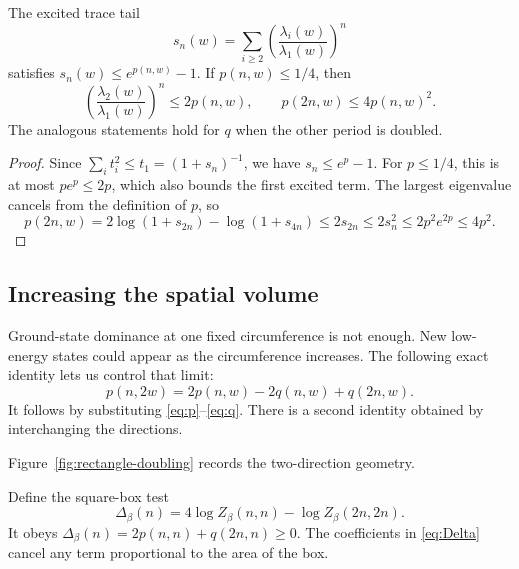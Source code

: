 \begin{samepage}
\begin{lemma}
\label{lem:squaring}
The excited trace tail
\[
 s_n(w)=\sum_{i\ge2}\left(\frac{\lambda_i(w)}{\lambda_1(w)}\right)^n
\]
satisfies \(s_n(w)\le e^{p(n,w)}-1\). If \(p(n,w)\le1/4\), then
\begin{equation}
\label{eq:squaring}
 \left(\frac{\lambda_2(w)}{\lambda_1(w)}\right)^n\le2p(n,w),
 \qquad p(2n,w)\le4p(n,w)^2.
\end{equation}
The analogous statements hold for \(q\) when the other period is doubled.
\end{lemma}
\end{samepage}

\begin{proof}
Since \(\sum_i t_i^2\le t_1=(1+s_n)^{-1}\), we have
\(s_n\le e^p-1\). For \(p\le1/4\), this is at most \(pe^p\le2p\),
which also bounds the first excited term. The largest eigenvalue cancels
from the definition of \(p\), so
\[
 p(2n,w)=2\log(1+s_{2n})-\log(1+s_{4n})
 \le2s_{2n}\le2s_n^2\le2p^2e^{2p}\le4p^2.
\]
\end{proof}

\subsection{Increasing the spatial volume}

Ground-state dominance at one fixed circumference is not enough. New
low-energy states could appear as the circumference increases. The
following exact identity lets us control that limit:
\begin{equation}
\label{eq:rectangle}
 p(n,2w)=2p(n,w)-2q(n,w)+q(2n,w).
\end{equation}
It follows by substituting \eqref{eq:p}--\eqref{eq:q}. There is a second
identity obtained by interchanging the directions.

Figure~\ref{fig:rectangle-doubling} records the two-direction geometry.


Define the square-box test
\begin{equation}
\label{eq:Delta}
 \Delta_\beta(n)=4\log Z_\beta(n,n)-\log Z_\beta(2n,2n).
\end{equation}
It obeys
\(\Delta_\beta(n)=2p(n,n)+q(2n,n)\ge0\). The coefficients in
\eqref{eq:Delta} cancel any term proportional to the area of the box.

